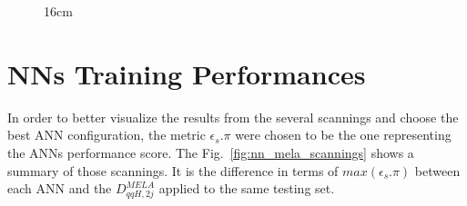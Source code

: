 \begin{figure}[hbtp]{16cm}
{		\label{}
	}
	
	\label{fig:nn_training_outputs}
\end{figure}


\section{NNs Training Performances}
In order to better visualize the results from the several scannings and choose the best ANN configuration, the metric $\epsilon_{s}.\pi$ were chosen to be the one representing the ANNs performance score. The Fig.~\ref{fig:nn_mela_scannings} shows a summary of those scannings. It is the difference in terms of $max(\epsilon_{s}.\pi)$ between each ANN and the $D_{qqH, 2j}^{MELA}$ applied to the same testing set.

